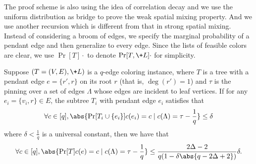 \documentclass[a4paper,11pt]{article}
\begin{document}
The proof scheme is also using the idea of correlation decay and we use the uniform distribution as bridge to prove the weak spatial mixing property. And we use another recursion which is different from that in strong spatial mixing.
Instead of considering a broom of edges, we specify the marginal probability of a pendant edge and then generalize to every edge.
Since the lists of feasible colors are clear, we use $\Pr[T]{\cdot}$ to denote $\Pr[T,\+L]{\cdot}$ for simplicity.
\begin{lemma}\label{lem:WSM_contraction}
Suppose $(T = (V,E), \+L)$ is a $q$-edge coloring instance, where $T$ is a tree with a pendant edge $e = \{r',r\}$ on its root $r$ (that is, $\deg(r')=1$) and $\tau$ is the pinning over a set of edges $\Lambda$ whose edges are incident to leaf vertices.  
If for any $e_i = \{v_i,r\}\in E$, the subtree $T_i$ with pendant edge $e_i$ satisfies that 
$$
    \forall c\in[q], \abs{\Pr[T_i\cup \{e_i\}]{c(e_i) = c\mid c(\Lambda) = \tau} - \frac 1q} \leq \delta
$$
where $\delta < \frac 1q$ is a universal constant, then we have that
$$
    \forall c\in [q], \abs{\Pr[T]{c(e) = c\mid c(\Lambda) = \tau} - \frac 1q} \leq \frac{2\Delta - 2}{q(1 - \delta\abs{q-2\Delta + 2})} \delta.
$$
\end{lemma}
\end{document}
